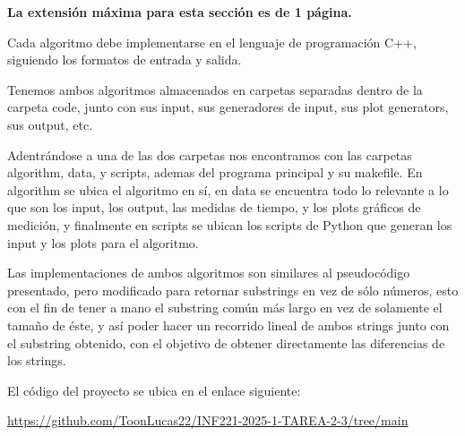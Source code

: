 \begin{mdframed}
    \textbf{La extensión máxima para esta sección es de 1 página.}
\end{mdframed}
\begin{mdframed}
    Cada algoritmo debe implementarse en el lenguaje de programación C++, siguiendo los formatos de entrada y salida.
\end{mdframed}
Tenemos ambos algoritmos almacenados en carpetas separadas dentro de la carpeta code, junto con sus input, sus generadores de input, sus plot generators, sus output, etc.

Adentrándose a una de las dos carpetas nos encontramos con las carpetas algorithm, data, y scripts, ademas del programa principal y su makefile. En algorithm se ubica el algoritmo en sí, en data se encuentra todo lo relevante a lo que son los input, los output, las medidas de tiempo, y los plots gráficos de medición, y finalmente en scripts se ubican los scripts de Python que generan los input y los plots para el algoritmo.

Las implementaciones de ambos algoritmos son similares al pseudocódigo presentado, pero modificado para retornar substrings en vez de sólo números, esto con el fin de tener a mano el substring común más largo en vez de solamente el tamaño de éste, y así poder hacer un recorrido lineal de ambos strings junto con el substring obtenido, con el objetivo de obtener directamente las diferencias de los strings.

El código del proyecto se ubica en el enlace siguiente:

\begin{mdframed}
    \begin{center}
        {\Large \url{https://github.com/ToonLucas22/INF221-2025-1-TAREA-2-3/tree/main}}
    \end{center}
\end{mdframed}
